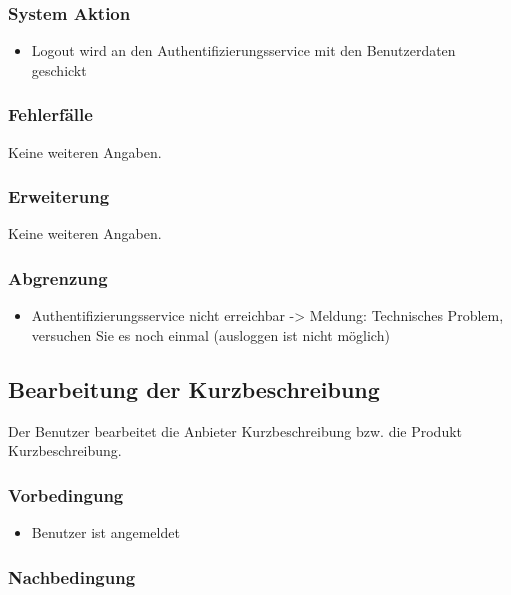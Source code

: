 \documentclass[a4paper,12pt]{article}
\begin{document}
\subsubsection{System Aktion}\label{system-aktion-1}

\begin{itemize}
\item
  Logout wird an den Authentifizierungsservice mit den Benutzerdaten
  geschickt
\end{itemize}

\subsubsection{Fehlerfälle}\label{fehlerfalle-1}
Keine weiteren Angaben.

\subsubsection{Erweiterung}\label{erweiterung}
Keine weiteren Angaben.

\subsubsection{Abgrenzung}\label{abgrenzung}

\begin{itemize}
\item
  Authentifizierungsservice nicht erreichbar -\textgreater{} Meldung:
  Technisches Problem, versuchen Sie es noch einmal (ausloggen ist nicht
  möglich)
\end{itemize}

\clearpage

\subsection{Bearbeitung der Kurzbeschreibung}
Der Benutzer bearbeitet die Anbieter Kurzbeschreibung bzw. die Produkt Kurzbeschreibung.
\subsubsection{Vorbedingung}

\begin{itemize}
\item
  Benutzer ist angemeldet
\end{itemize}

\subsubsection{Nachbedingung}\label{nachbedingung-2}
\end{document}
